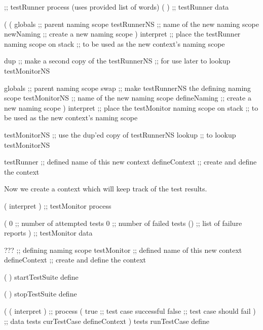 \startJoylolCode

                 ;; testRunner process (uses provided list of words)
( 
)                ;; testRunner data

(
  (
    globals      ;; parent naming scope
    testRunnerNS ;; name of the new naming scope
    newNaming    ;; create a new naming scope
  ) interpret    ;; place the testRunner naming scope on stack
                 ;; to be used as the new context's naming scope

  dup            ;; make a second copy of the testRunnerNS 
                 ;; for use later to lookup testMonitorNS
  
  globals        ;; parent naming scope
  swap           ;; make testRunnerNS the defining naming scope
  testMonitorNS  ;; name of the new naming scope
  defineNaming   ;; create a new naming scope
) interpret      ;; place the testMonitor naming scope on stack
                 ;; to be used as the new context's naming scope
                 
  testMonitorNS  ;; use the dup'ed copy of testRunnerNS
  lookup         ;; to lookup testMonitorNS
  
testRunner       ;; defined name of this new context
defineContext    ;; create and define the context
\stopJoylolCode

Now we create a context which will keep track of the test results. 

\startJoylolCode
( interpret ) ;; testMonitor process

( 
  0           ;; number of attempted tests
  0           ;; number of failed tests
  ()          ;; list of failure reports
)             ;; testMonitor data


???           ;; defining naming scope
testMonitor   ;; defined name of this new context
defineContext ;; create and define the context
\stopJoylolCode



\stopTestSuite

\starttyping
{}

\startJoylolCode
  (
  )
  startTestSuite
  define
  
  (
  )
  stopTestSuite
  define
\stopJoylolCode

\stopTestSuite
\stoptyping


\startJoylolCode
(
  ( interpret ) ;; process
  (
    true ;; test case successful
    false ;; test case should fail
  ) ;; data
  tests
  curTestCase
  defineContext
)
tests
runTestCase
define
\stopJoylolCode

